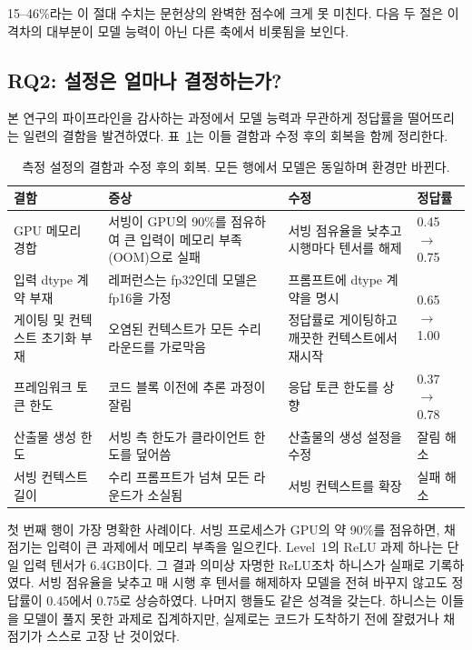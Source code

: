 \documentclass[11pt]{article}
\newcommand{\headrow}[1]{\textbf{#1}}
\begin{document}
15--46\%라는 이 절대 수치는 문헌상의 완벽한 점수에 크게 못 미친다. 다음 두 절은 이 격차의 대부분이
모델 능력이 아닌 다른 축에서 비롯됨을 보인다.

\subsection{RQ2: 설정은 얼마나 결정하는가?}\label{sec:rq2}

본 연구의 파이프라인을 감사하는 과정에서 모델 능력과 무관하게 정답률을 떨어뜨리는 일련의 결함을
발견하였다. 표~\ref{tab:rq2}는 이들 결함과 수정 후의 회복을 함께 정리한다.

\begin{table}[t]
\centering
\small
\setlength{\tabcolsep}{7pt}
\caption{측정 설정의 결함과 수정 후의 회복. 모든 행에서 모델은 동일하며 환경만 바뀐다.}
\label{tab:rq2}
\begin{tabular}{@{}p{}p{}p{}l@{}}
\toprule
\headrow{결함} & \headrow{증상} & \headrow{수정} & \headrow{정답률} \\
\midrule
GPU 메모리 경합 & 서빙이 GPU의 90\%를 점유하여 큰 입력이 메모리 부족(OOM)으로 실패
  & 서빙 점유율을 낮추고 시행마다 텐서를 해제 & 0.45 $\rightarrow$ 0.75 \\
\addlinespace[2pt]
입력 dtype 계약 부재 & 레퍼런스는 fp32인데 모델은 fp16을 가정
  & 프롬프트에 dtype 계약을 명시 & \multirow{2}{*}{0.65 $\rightarrow$ 1.00} \\
\addlinespace[2pt]
게이팅 및 컨텍스트 초기화 부재 & 오염된 컨텍스트가 모든 수리 라운드를 가로막음
  & 정답률로 게이팅하고 깨끗한 컨텍스트에서 재시작 & \\
\addlinespace[2pt]
프레임워크 토큰 한도 & 코드 블록 이전에 추론 과정이 잘림
  & 응답 토큰 한도를 상향 & 0.37 $\rightarrow$ 0.78 \\
\addlinespace[2pt]
산출물 생성 한도 & 서빙 측 한도가 클라이언트 한도를 덮어씀
  & 산출물의 생성 설정을 수정 & 잘림 해소 \\
\addlinespace[2pt]
서빙 컨텍스트 길이 & 수리 프롬프트가 넘쳐 모든 라운드가 소실됨
  & 서빙 컨텍스트를 확장 & 실패 해소 \\
\bottomrule
\end{tabular}
\end{table}

첫 번째 행이 가장 명확한 사례이다. 서빙 프로세스가 GPU의 약 90\%를 점유하면, 채점기는 입력이 큰
과제에서 메모리 부족을 일으킨다. Level~1의 ReLU 과제 하나는 단일 입력 텐서가 6.4GB이다. 그 결과
의미상 자명한 ReLU조차 하니스가 실패로 기록하였다. 서빙 점유율을 낮추고 매 시행 후 텐서를 해제하자
모델을 전혀 바꾸지 않고도 정답률이 0.45에서 0.75로 상승하였다. 나머지 행들도 같은 성격을 갖는다.
하니스는 이들을 모델이 풀지 못한 과제로 집계하지만, 실제로는 코드가 도착하기 전에 잘렸거나
채점기가 스스로 고장 난 것이었다.
\end{document}
